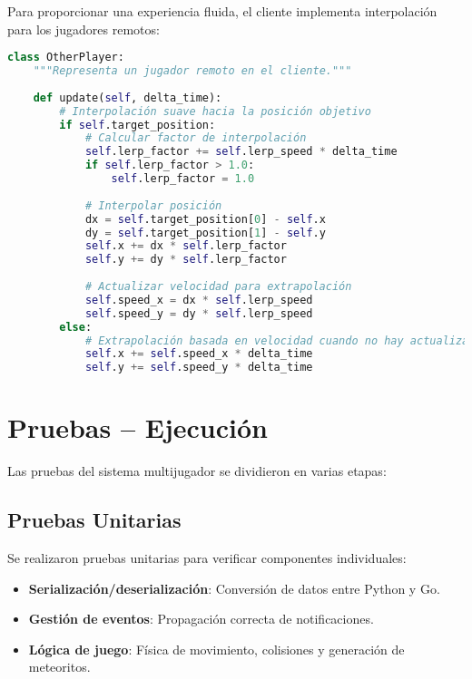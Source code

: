 \documentclass[11pt,letterpaper]{article}
\begin{document}
Para proporcionar una experiencia fluida, el cliente implementa interpolación para los jugadores remotos:

\begin{lstlisting}[language=python, caption=Implementación de interpolación para jugadores remotos]
class OtherPlayer:
    """Representa un jugador remoto en el cliente."""
    
    def update(self, delta_time):
        # Interpolación suave hacia la posición objetivo
        if self.target_position:
            # Calcular factor de interpolación
            self.lerp_factor += self.lerp_speed * delta_time
            if self.lerp_factor > 1.0:
                self.lerp_factor = 1.0
            
            # Interpolar posición
            dx = self.target_position[0] - self.x
            dy = self.target_position[1] - self.y
            self.x += dx * self.lerp_factor
            self.y += dy * self.lerp_factor
            
            # Actualizar velocidad para extrapolación
            self.speed_x = dx * self.lerp_speed
            self.speed_y = dy * self.lerp_speed
        else:
            # Extrapolación basada en velocidad cuando no hay actualizaciones
            self.x += self.speed_x * delta_time
            self.y += self.speed_y * delta_time
\end{lstlisting}

\section{Pruebas – Ejecución}

Las pruebas del sistema multijugador se dividieron en varias etapas:

\subsection{Pruebas Unitarias}

Se realizaron pruebas unitarias para verificar componentes individuales:

\begin{itemize}
    \item \textbf{Serialización/deserialización}: Conversión de datos entre Python y Go.
    \item \textbf{Gestión de eventos}: Propagación correcta de notificaciones.
    \item \textbf{Lógica de juego}: Física de movimiento, colisiones y generación de meteoritos.
\end{itemize}
\end{document}
